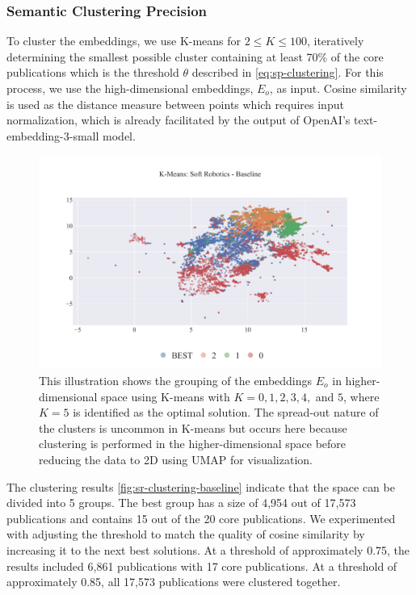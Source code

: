 \subsubsection{Semantic Clustering Precision}

To cluster the embeddings, we use K-means for $2 \leq K \leq 100$, iteratively determining the smallest possible cluster containing at least 70\% of the core publications which is the threshold $\theta$ described in \autoref{eq:sp-clustering}. For this process, we use the high-dimensional embeddings, $E_o$, as input. Cosine similarity is used as the distance measure between points which requires input normalization, which is already facilitated by the output of OpenAI's text-embedding-3-small model.

\begin{figure}[!hb]
	\centering	
	\includegraphics[scale=0.6]{pics/sr-clustering-baseline.pdf}
	\caption[Semantic Clustering Soft Robotics]{This illustration shows the grouping of the embeddings $E_o$ in higher-dimensional space using K-means with $K = 0, 1, 2, 3, 4,$ and $5$, where $K=5$ is identified as the optimal solution. The spread-out nature of the clusters is uncommon in K-means but occurs here because clustering is performed in the higher-dimensional space before reducing the data to 2D using UMAP for visualization.}\label{fig:sr-clustering-baseline}
\end{figure}

The clustering results \autoref{fig:sr-clustering-baseline} indicate that the space can be divided into 5 groups. The best group has a size of 4,954 out of 17,573 publications and contains 15 out of the 20 core publications. We experimented with adjusting the threshold to match the quality of cosine similarity by increasing it to the next best solutions. At a threshold of approximately 0.75, the results included 6,861 publications with 17 core publications. At a threshold of approximately 0.85, all 17,573 publications were clustered together.

